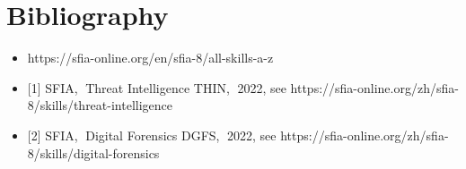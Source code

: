 \documentclass[a4paper, 11pt]{report}
\begin{document}

\newpage

\section{Bibliography} 
\begin{itemize}
\item{{https://sfia-online.org/en/sfia-8/all-skills-a-z}}
\item{[1] SFIA, Threat Intelligence THIN, 2022, see https://sfia-online.org/zh/sfia-8/skills/threat-intelligence}
\item{[2] SFIA, Digital Forensics DGFS, 2022, see https://sfia-online.org/zh/sfia-8/skills/digital-forensics}


\end{itemize}
\end{document}
